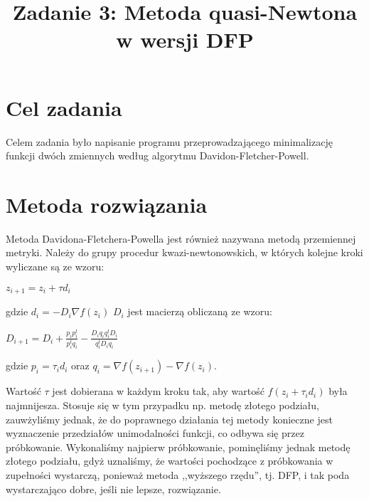 \documentclass{classrep}
\author{%
  \studentinfo{Michał Janiszewski}{169485} \and
  \studentinfo{Leszek Wach}{169513}
}
\title{Zadanie 3: Metoda quasi-Newtona w wersji DFP}
\begin{document}
\maketitle

\section{Cel zadania}
Celem zadania było napisanie programu przeprowadzającego minimalizację funkcji dwóch zmiennych według algorytmu Davidon-Fletcher-Powell.

\section{Metoda rozwiązania}
Metoda Davidona-Fletchera-Powella jest również nazywana metodą przemiennej metryki. Należy do grupy procedur kwazi-newtonowskich, w których kolejne kroki wyliczane są ze wzoru:
\begin{center}
	$z_{i+1} = z_i + \tau d_i$
\end{center}
gdzie $d_i = -D_i \nabla f(z_i)$
$D_i$ jest macierzą obliczaną ze wzoru:
\begin{center}
$D_{i+1} = D_i + \frac{p_i p^{t}_i}{p^{t}_i q_i} - \frac{D_i q_i q^{t}_i D_i}{q^{t}_i D_i q_i}$\\
\end{center}
gdzie $p_i = \tau_i d_i$ oraz $q_i = \nabla f(z_{i+1}) - \nabla f(z_i)$.

Wartość $\tau$ jest dobierana w każdym kroku tak, aby wartość $f(z_i + \tau_i d_i)$ była najmnijesza. Stosuje się w tym przypadku np. metodę złotego podziału, zauwżyliśmy jednak, że do poprawnego działania tej metody konieczne jest wyznaczenie przedziałów unimodalności funkcji, co odbywa się przez próbkowanie. Wykonaliśmy najpierw próbkowanie, pominęliśmy jednak metodę złotego podziału, gdyż uznaliśmy, że wartości pochodzące z próbkowania w zupełności wystarczą, ponieważ metoda ,,wyższego rzędu'', tj. DFP, i tak poda wystarczająco dobre, jeśli nie lepsze, rozwiązanie.
\end{document}
